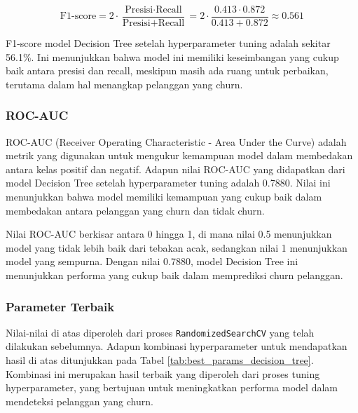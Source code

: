 \begin{equation}
    \text{F1-score} = 2 \cdot \frac{\text{Presisi} \cdot \text{Recall}}{\text{Presisi} + \text{Recall}} = 2 \cdot \frac{0.413 \cdot 0.872}{0.413 + 0.872} \approx 0.561
\end{equation}

F1-score model Decision Tree setelah hyperparameter tuning adalah sekitar 56.1\%. Ini menunjukkan bahwa model ini memiliki keseimbangan yang cukup baik antara presisi dan recall, meskipun masih ada ruang untuk perbaikan, terutama dalam hal menangkap pelanggan yang churn.

\subsubsection*{ROC-AUC}
ROC-AUC (Receiver Operating Characteristic - Area Under the Curve) adalah metrik yang digunakan untuk mengukur kemampuan model dalam membedakan antara kelas positif dan negatif. Adapun nilai ROC-AUC yang didapatkan dari model Decision Tree setelah hyperparameter tuning adalah 0.7880. Nilai ini menunjukkan bahwa model memiliki kemampuan yang cukup baik dalam membedakan antara pelanggan yang churn dan tidak churn.

Nilai ROC-AUC berkisar antara 0 hingga 1, di mana nilai 0.5 menunjukkan model yang tidak lebih baik dari tebakan acak, sedangkan nilai 1 menunjukkan model yang sempurna. Dengan nilai 0.7880, model Decision Tree ini menunjukkan performa yang cukup baik dalam memprediksi churn pelanggan.

\subsubsection{Parameter Terbaik}
Nilai-nilai di atas diperoleh dari proses \texttt{RandomizedSearchCV} yang telah dilakukan sebelumnya. Adapun kombinasi hyperparameter untuk mendapatkan hasil di atas ditunjukkan pada Tabel \ref{tab:best_params_decision_tree}. Kombinasi ini merupakan hasil terbaik yang diperoleh dari proses tuning hyperparameter, yang bertujuan untuk meningkatkan performa model dalam mendeteksi pelanggan yang churn.


